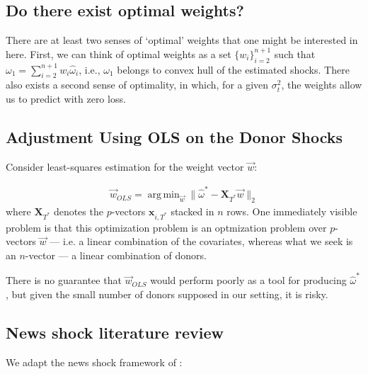 \documentclass[11pt]{article}
\newcommand{\x}{\textbf{x}}
\newcommand{\X}{\textbf{X}}
\DeclareMathOperator*{\argmin}{arg\,min} %
\theoremstyle{definition}
\begin{document}
\subsection{Do there exist optimal weights?}
There are at least two senses of `optimal' weights that one might be interested in here.  First, we can think of optimal weights as a set $\{w_{i}\}_{i=2}^{n+1}$ such that $\omega_{1} = \sum^{n+1}_{i=2}w_{i}\hat\omega_{i}$, i.e., $\omega_{1}$ belongs to convex hull of the estimated shocks.  There also exists a second sense of optimality, in which, for a given $\sigma_{t}^{2}$, the weights allow us to predict with zero loss.

\subsection{Adjustment Using OLS on the Donor Shocks}
Consider least-squares estimation for the weight vector $\vec{w}$:

\begin{align*}{
\vec{w}_{OLS}=\argmin_{\vec{w}} \|\hat{\omega}^{*} - \X_{T^{*}}\vec{w}\|_{2}}
\end{align*} 
where $\X_{T^{*}}$ denotes the $p$-vectors $\x_{i,T^{*}}$ stacked in $n$ rows.  One immediately visible problem is that this optimization problem is an optmization problem over $p$-vectors $\vec{w}$ --- i.e. a linear combination of the covariates, whereas what we seek is an $n$-vector --- a linear combination of donors.

There is no guarantee that $\vec{w}_{OLS}$ would perform poorly as a tool for producing $\hat\omega^{*}$, but given the small number of donors supposed in our setting, it is risky.
\subsection{News shock literature review}

We adapt the news shock framework of \citet{kilian2017structural}: \\
\end{document}
